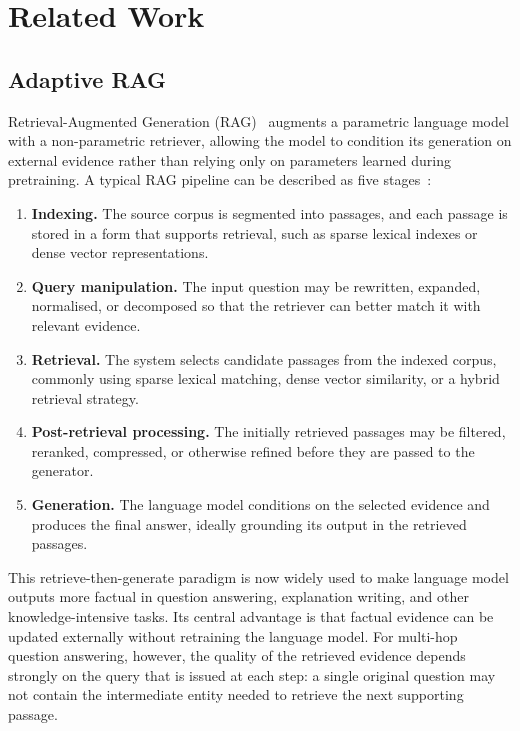 \chapter{Related Work}
\label{ch:related}

\section{Adaptive RAG}
\label{sec:adaptive-rag}

Retrieval-Augmented Generation (RAG)~\cite{rag_survey} augments a parametric language model with a non-parametric retriever, allowing the model to condition its generation on external evidence rather than relying only on parameters learned during pretraining. A typical RAG pipeline can be described as five stages~\cite{ragtext_survey}:

\begin{enumerate}
    \item \textbf{Indexing.} The source corpus is segmented into passages, and each passage is stored in a form that supports retrieval, such as sparse lexical indexes or dense vector representations.
    \item \textbf{Query manipulation.} The input question may be rewritten, expanded, normalised, or decomposed so that the retriever can better match it with relevant evidence.
    \item \textbf{Retrieval.} The system selects candidate passages from the indexed corpus, commonly using sparse lexical matching, dense vector similarity, or a hybrid retrieval strategy.
    \item \textbf{Post-retrieval processing.} The initially retrieved passages may be filtered, reranked, compressed, or otherwise refined before they are passed to the generator.
    \item \textbf{Generation.} The language model conditions on the selected evidence and produces the final answer, ideally grounding its output in the retrieved passages.
\end{enumerate}

This retrieve-then-generate paradigm is now widely used to make language model outputs more factual in question answering, explanation writing, and other knowledge-intensive tasks. Its central advantage is that factual evidence can be updated externally without retraining the language model. For multi-hop question answering, however, the quality of the retrieved evidence depends strongly on the query that is issued at each step: a single original question may not contain the intermediate entity needed to retrieve the next supporting passage.

